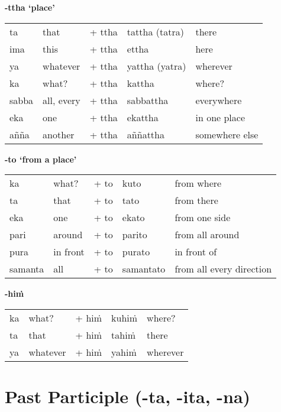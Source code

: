 \documentclass[11pt,oneside]{memoir}
\begin{document}
\textbf{-ttha `place'}

\begin{center}
\begin{tabular}{lllll}
ta & that & + ttha & tattha (tatra) & there\\[0pt]
ima & this & + ttha & ettha & here\\[0pt]
ya & whatever & + ttha & yattha (yatra) & wherever\\[0pt]
ka & what? & + ttha & kattha & where?\\[0pt]
sabba & all, every & + ttha & sabbattha & everywhere\\[0pt]
eka & one & + ttha & ekattha & in one place\\[0pt]
añña & another & + ttha & aññattha & somewhere else\\[0pt]
\end{tabular}
\end{center}

\textbf{-to `from a place'}

\begin{center}
\begin{tabular}{lllll}
ka & what? & + to & kuto & from where\\[0pt]
ta & that & + to & tato & from there\\[0pt]
eka & one & + to & ekato & from one side\\[0pt]
pari & around & + to & parito & from all around\\[0pt]
pura & in front & + to & purato & in front of\\[0pt]
samanta & all & + to & samantato & from all every direction\\[0pt]
\end{tabular}
\end{center}

\textbf{-hiṁ}

\begin{center}
\begin{tabular}{lllll}
ka & what? & + hiṁ & kuhiṁ & where?\\[0pt]
ta & that & + hiṁ & tahiṁ & there\\[0pt]
ya & whatever & + hiṁ & yahiṁ & wherever\\[0pt]
\end{tabular}
\end{center}

\section{Past Participle (-ta, -ita, -na)}
\label{sec:org7ab7077}
\end{document}
